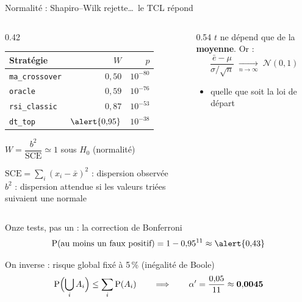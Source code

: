 \documentclass[10pt]{beamer}
\begin{document}
\begin{frame}{Normalité : Shapiro--Wilk rejette\ldots\ le TCL répond}
  \begin{columns}[T]
    \begin{column}{0.42\textwidth}
      \footnotesize
      \begin{tabular}{@{}lrr@{}}
        \toprule
        Stratégie & $W$ & $p$ \\
        \midrule
        \texttt{ma\_crossover} & $0{,}50$ & $10^{-80}$ \\
        \texttt{oracle}        & $0{,}59$ & $10^{-76}$ \\
        \texttt{rsi\_classic}  & $0{,}87$ & $10^{-53}$ \\
        \texttt{dt\_top}       & $\alert{0{,}95}$ & $10^{-38}$ \\
        \bottomrule
      \end{tabular}
      \vspace{2mm}

      {\footnotesize $W = \dfrac{b^2}{\mathrm{SCE}} \simeq 1$ sous $H_0$
      (normalité)}
      \vspace{1.5mm}

      {\scriptsize $\mathrm{SCE}=\sum_i(x_i-\bar x)^2$ : dispersion
      observée\\[0.5mm]
      $b^2$ : dispersion attendue si les valeurs triées suivaient une
      normale}
    \end{column}
    \begin{column}{0.54\textwidth}
      \small
      $t$ ne dépend que de la \textbf{moyenne}. Or :
      \[
        \frac{\bar e - \mu}{\sigma/\sqrt{n}}
        \;\xrightarrow[n\to\infty]{}\; \mathcal N(0,1)
      \]
      \begin{itemize}
        \item quelle que soit la loi de départ
      \end{itemize}
    \end{column}
  \end{columns}
\end{frame}

\begin{frame}{Onze tests, pas un : la correction de Bonferroni}
  \[
    \mathrm P(\text{au moins un faux positif})
      = 1 - 0{,}95^{11} \approx \alert{0{,}43}
  \]
  \vspace{2mm}
  \begin{block}{On inverse : risque global fixé à 5\,\% (inégalité de Boole)}
    \[
      \mathrm P\Bigl(\bigcup_i A_i\Bigr) \leq \sum_i \mathrm P(A_i)
      \qquad\Longrightarrow\qquad
      \alpha' = \frac{0{,}05}{11} \approx \mathbf{0{,}0045}
    \]
  \end{block}
\end{frame}
\end{document}
